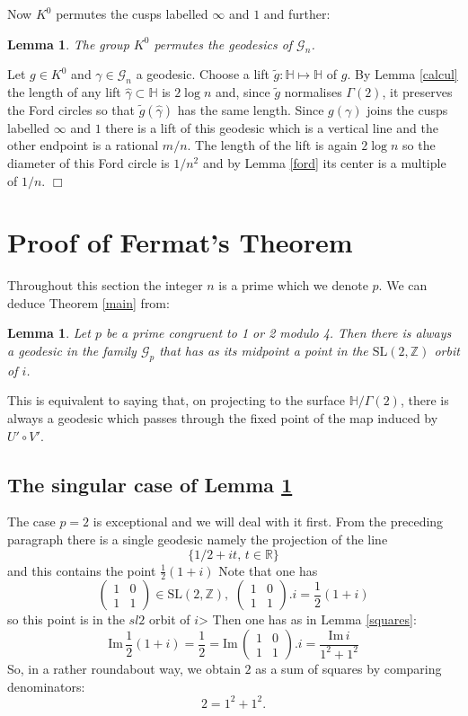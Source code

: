 \documentclass[12pt,a4paper]{amsart}
\newtheorem{lem}[thm]{Lemma}
\def\HH{\mathbb{H}}
\def\im{\mathrm{Im}\,}
\def\xx{\HH/g2}
\def\ZZ{\mathbb{Z}}
\def\RR{\mathbb{R}}
\def\sl2{\mathrm{SL}(2, \ZZ)}
\def\g2{\Gamma(2)}
\def\xx{\HH/\g2}
\def\gg{\mathcal{G}_n}
\def\ggp{\mathcal{G}_p}
\begin{document}
Now $K^0$ permutes the cusps labelled $\infty$ and $1$
and further:

\begin{lem} \label{action}
 The group $K^0$  permutes the geodesics of $\gg$.
\end{lem}
\proof
Let $g \in K^0$ and $\gamma \in \gg$ a geodesic.
Choose a lift $\tilde{g} : \HH \mapsto \HH$ of $g$.
By Lemma  \ref{calcul} the  length of any lift  $\hat{\gamma} \subset \HH$ is $2\log n$
and, since $\tilde{g}$ normalises $\g2$, it preserves the Ford circles
so that  $\tilde{g}(\hat{\gamma})$ has the same length.
Since $g(\gamma)$ joins the cusps labelled $\infty$ and $1$
there is a lift of this geodesic which is a vertical line
 and the other endpoint is a rational $m/n$.
The length of the lift  is again $2 \log n$ so
the diameter of this  Ford circle is $1/n^2$
and by Lemma \ref{ford} its center is a multiple of $1/n$.
\hfill $\Box$


 
 \section{Proof of Fermat's Theorem}

Throughout this section the integer $n$ is a prime which we denote $p$.
We can deduce Theorem \ref{main} from:

\begin{lem} \label{midpoint}
Let $p$ be a prime congruent to 1 or 2 modulo 4.
Then there is always a geodesic 
in the family $\ggp$
 that has as its  midpoint a point in the $\sl2$  orbit of $i$.
\end{lem}


This is equivalent to saying that, 
on projecting to the surface  $\xx$,
 there  is always a geodesic which passes through
the  fixed point of the map induced by $U'\circ V'$.

\subsection{The singular case of Lemma \ref{midpoint}}

The case $p=2$ is exceptional and we will deal with it first.
From the preceding paragraph there is a single geodesic namely 
the projection of the line 
$$\{ 1/2 + i t,\, t \in \RR \}$$
and this contains the point  $\frac{1}{2 }(1+ i)$
Note that one has 
$$\begin{pmatrix}
1 & 0 \\
1 & 1
\end{pmatrix} \in \sl2,\,\, \begin{pmatrix}
1 & 0 \\
1 & 1
\end{pmatrix}.i  = \frac{1}{2 }(1+ i)$$
so this point is in the $sl2$ orbit of $i$>
Then one has as in Lemma \ref{squares}:
$$\im \frac{1}{2 }(1+ i) = \frac{1}{2}  =  \im \begin{pmatrix}
1 & 0 \\
1 & 1
\end{pmatrix}.i = \frac{\im i}{ 1^2 + 1^2}$$
So, in a rather roundabout way, we obtain $2$ as a sum of squares by comparing denominators:
$$2 = 1^2 + 1^2.$$
\end{document}
